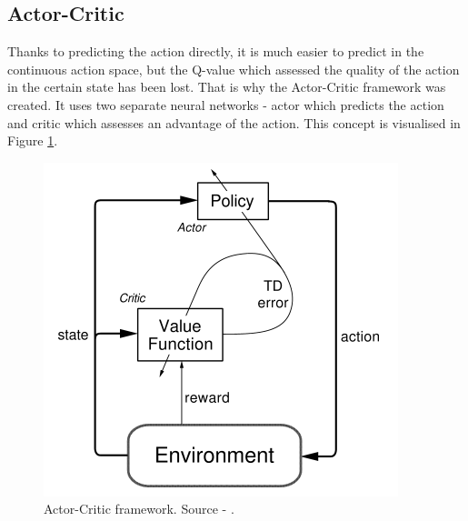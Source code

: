 \subsection{Actor-Critic}
Thanks to predicting the action directly, it is much easier to predict in the continuous action space, but the Q-value which assessed the quality of the action in the certain state has been lost. That is why the Actor-Critic framework was created. It uses two separate neural networks - actor which predicts the action and critic which assesses an advantage of the action. This concept is visualised in Figure \ref{fig:actorcritic}.
\begin{figure}[H]
\centering
\includegraphics[scale=0.55]{fig/actor-critic.png}
\caption[Actor-Critic framework]{Actor-Critic framework. Source - \cite{sutton2012}.}
\label{fig:actorcritic}
\end{figure}

